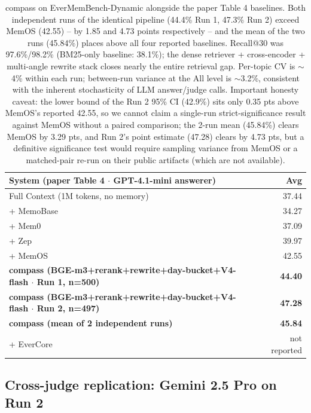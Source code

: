 \begin{table}[h]
\centering
\begin{tabular}{lr}
\toprule
System (paper Table 4 $\cdot$ GPT-4.1-mini answerer) & Avg \\
\midrule
Full Context (1M tokens, no memory) & 37.44 \\
+ MemoBase                          & 34.27 \\
+ Mem0                              & 37.09 \\
+ Zep                               & 39.97 \\
+ MemOS                             & 42.55 \\
\textbf{compass (BGE-m3+rerank+rewrite+day-bucket+V4-flash $\cdot$ Run 1, n=500)} & \textbf{44.40} \\
\textbf{compass (BGE-m3+rerank+rewrite+day-bucket+V4-flash $\cdot$ Run 2, n=497)} & \textbf{47.28} \\
\textbf{compass (mean of 2 independent runs)}                                    & \textbf{45.84} \\
+ EverCore                          & not reported \\
\bottomrule
\end{tabular}
\caption{compass on EverMemBench-Dynamic alongside the paper Table 4
baselines. Both independent runs of the identical pipeline (44.4\% Run 1,
47.3\% Run 2) exceed MemOS (42.55) -- by 1.85 and 4.73 points respectively
-- and the mean of the two runs (45.84\%) places above all four reported
baselines. Recall@30 was 97.6\%/98.2\% (BM25-only baseline: 38.1\%); the
dense retriever + cross-encoder + multi-angle rewrite stack closes nearly
the entire retrieval gap. Per-topic CV is $\sim$4\% within each run;
between-run variance at the All level is $\sim$3.2\%, consistent with the
inherent stochasticity of LLM answer/judge calls. Important honesty
caveat: the lower bound of the Run 2 95\% CI (42.9\%) sits only 0.35 pts
above MemOS's reported 42.55, so we cannot claim a single-run
strict-significance result against MemOS without a paired comparison; the
2-run mean (45.84\%) clears MemOS by 3.29 pts, and Run 2's point estimate
(47.28) clears by 4.73 pts, but a definitive significance test would
require sampling variance from MemOS or a matched-pair re-run on their
public artifacts (which are not available).}
\label{tab:em-full-stack}
\end{table}

\subsection{Cross-judge replication: Gemini 2.5 Pro on Run 2}
\label{sec:em-crossjudge-gemini}

